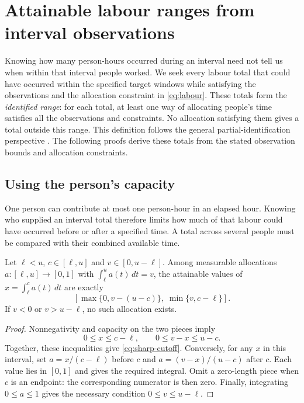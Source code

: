 \section{Attainable labour ranges from interval observations}
\label{sec:sharp-identification}

Knowing how many person-hours occurred during an interval need not tell us when within that interval people worked. We seek every labour total that could have occurred within the specified target windows while satisfying the observations and the allocation constraint in \eqref{eq:labour}. These totals form the \emph{identified range}: for each total, at least one way of allocating people's time satisfies all the observations and constraints. No allocation satisfying them gives a total outside this range. This definition follows the general partial-identification perspective \cite[Section~1]{torgovitsky2019}. The following proofs derive these totals from the stated observation bounds and allocation constraints.

\subsection{Using the person's capacity}

One person can contribute at most one person-hour in an elapsed hour. Knowing who supplied an interval total therefore limits how much of that labour could have occurred before or after a specified time. A total across several people must be compared with their combined available time.

\begin{proposition}
\label{prop:sharp-cutoff}
Let $\ell<u$, $c\in[\ell,u]$ and $v\in[0,u-\ell]$. Among measurable allocations $a:[\ell,u]\to[0,1]$ with $\int_\ell^u a(t)\,dt=v$, the attainable values of $x=\int_\ell^c a(t)\,dt$ are exactly
\begin{equation}
\label{eq:sharp-cutoff}
 \left[\max\{0,v-(u-c)\},\;\min\{v,c-\ell\}\right].
\end{equation}
If $v<0$ or $v>u-\ell$, no such allocation exists.
\end{proposition}
\begin{proof}
Nonnegativity and capacity on the two pieces imply
\[
 0\leq x\leq c-\ell,\qquad 0\leq v-x\leq u-c.
\]
Together, these inequalities give \eqref{eq:sharp-cutoff}. Conversely, for any $x$ in this interval, set $a=x/(c-\ell)$ before $c$ and $a=(v-x)/(u-c)$ after $c$. Each value lies in $[0,1]$ and gives the required integral. Omit a zero-length piece when $c$ is an endpoint: the corresponding numerator is then zero. Finally, integrating $0\leq a\leq1$ gives the necessary condition $0\leq v\leq u-\ell$.
\end{proof}

